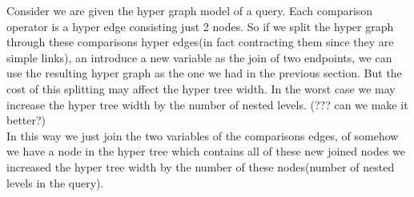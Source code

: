 \documentclass[12pt]{article}
\begin{document}
Consider we are given the hyper graph model of a query. Each comparison operator is a hyper edge consisting just 2 nodes. So if we split the hyper graph through these comparisons hyper edges(in fact contracting them since they are simple links), an introduce a new variable as the join of two endpoints, we can use the resulting hyper graph as the one we had in the previous section. But the cost of this splitting may affect the hyper tree width. In the worst case we may increase the hyper tree width by the number of nested levels. (??? can we make it better?)\\

In this way we just join the two variables of the comparisons edges, of somehow we have a node in the hyper tree which contains all of these new joined nodes we increased the hyper tree width by the number of these nodes(number of nested levels in the query). 
\end{document}
